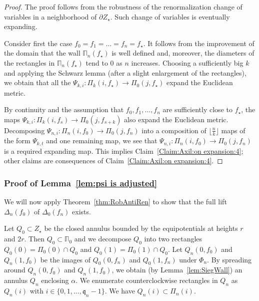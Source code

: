 \documentclass[]{amsart}
\newcommand{\bDelta}{{\mathbb{\Delta}}}
\newcommand{\bPi}{{\mathbb{\Pi}}}
\newcommand{\str}{{\star}}
\renewcommand{\qq}{\mathfrak{q}}
\newcommand\wall{{Q}}
\theoremstyle{remark}
\numberwithin{equation}{section}
\theoremstyle{definition}
\begin{document}
\begin{proof}
The proof follows from the robustness of the renormalization change of variables in a neighborhood of $\partial Z_\str$. Such change of variables is eventually expanding.

Consider first the case $f_0=f_1=\dots= f_n= f_\str$. It follows from the improvement of the domain that the wall $\bPi_n(f_\str)$ is well defined and, moreover, the diameters of the rectangles in $\bPi_n(f_\str)$ tend to $0$ as $n$ increases. Choosing a sufficiently big $k$ and applying the Schwarz lemma (after a slight enlargement of the rectangles), we obtain that all the $\Psi_{k,i}  \colon \Pi_k(i, f_\str)\to \Pi_0(j,f_\str)$ expand the Euclidean metric. 

By continuity and the assumption that $f_0,f_1,\dots, f_n$ are sufficiently close to $f_\str$, the maps $\Psi_{k,i}  \colon \Pi_k(i, f_{s})\to \Pi_0(j,f_{s+k})$ also expand the Euclidean metric. Decomposing $\Psi_{n,i}  \colon \Pi_n(i, f_{0})\to \Pi_0(j,f_{n})$ into a composition of $\lfloor \frac n k \rfloor$ maps of the form $\Psi_{k,t}$ and one remaining map, we see that $\Psi_{n,i}  \colon \Pi_n(i, f_{0})\to \Pi_0(j,f_{n})$ is a required expanding map. This implies Claim~\eqref{Claim:Axil:on expansion:4}; other claims are consequences of Claim~\eqref{Claim:Axil:on expansion:4}.
\end{proof}



\subsubsection{Proof of Lemma~\ref{lem:psi is adjusted}}
We will now apply Theorem~\ref{thm:RobAntiRen} to show that the full lift $\bDelta_{n}(f_0)$ of $\bDelta_{0}(f_n)$ exists.




Let $\wall_0\subset Z_\str$ be the closed annulus bounded by the equipotentials at heights $r$ and $2r$. Then $\wall_0\subset \bPi_0$ and we decompose $\wall_0$ into two rectangles $\wall_0(0)=\Pi_0(0)\cap \wall_0$ and  $\wall_0(1)=\Pi_0(1)\cap \wall_0$. Let $\wall_n(0,f_0)$ and $\wall_n(1,f_0)$ be the images of $\wall_0(0,f_n)$ and $\wall_0(1,f_n)$ under $\Phi_n$. By spreading around $\wall_n(0,f_0)$ and $\wall_n(1,f_0)$, we obtain (by  Lemma~\ref{lem:SiegWall}) an annulus $\wall_n$ enclosing $\alpha$. We enumerate counterclockwise rectangles in $\wall_n$ as $\wall_n(i)$ with $i\in \{0,1,\dots, \qq_n-1\}$. We have $\wall_n(i)\subset \Pi_n(i)$. 
\end{document}
